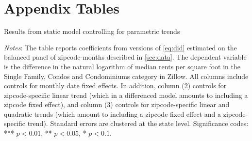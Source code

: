 
\section{Appendix Tables}

\begin{table}[h!]
	\caption{Results from static model controlling for parametric trends}
	\label{tab:did_trend}
	\centering
	
	\begin{minipage}{0.95\textwidth} \footnotesize
		\vspace{3mm} 
		\textit{Notes}: The table reports coefficients from versions of \autoref{eq:did} 
		estimated on the balanced panel of zipcode-months described in \autoref{sec:data}. 
		The dependent variable is the difference in the natural logarithm of median	rents 
		per	square foot in the Single Family, Condos and Condominiums category in Zillow. 
		All columns include	controls for monthly date fixed effects. In addition, column 
		(2) controls for zipcode-specific linear trend (which in a differenced model 
		amounts to including a zipcode fixed effect), and column (3) controls for 
		zipcode-specific linear and	quadratic trends (which amount to including a zipcode 
		fixed effect and a zipcode-specific trend). Standard errors are clustered at 
		the state level. Significance codes: *** $p < 0.01$, ** $p < 0.05$, * $p < 0.1$.
	\end{minipage}
\end{table}

